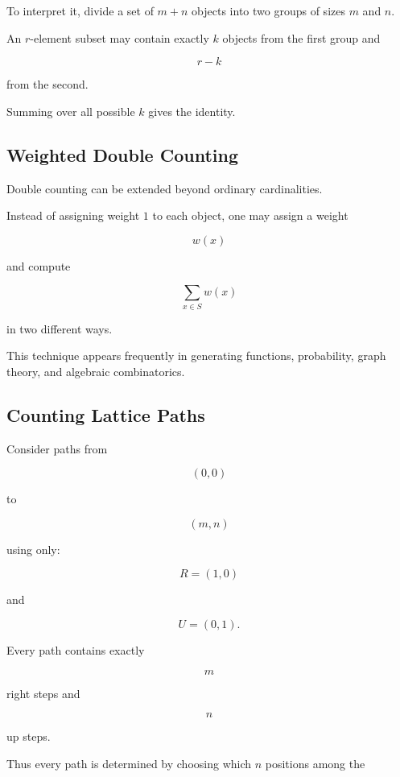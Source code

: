 To interpret it, divide a set of \(m+n\) objects into two groups of
sizes \(m\) and \(n\).

An \(r\)-element subset may contain exactly \(k\) objects from the first
group and

\[
r-k
\]

from the second.

Summing over all possible \(k\) gives the identity.

\subsection{Weighted Double Counting}
\label{subsec:weighted-double-counting}

Double counting can be extended beyond ordinary cardinalities.

Instead of assigning weight \(1\) to each object, one may assign a
weight

\[
w(x)
\]

and compute

\[
\sum_{x\in S}w(x)
\]

in two different ways.

This technique appears frequently in generating functions,
probability, graph theory, and algebraic combinatorics.

\subsection{Counting Lattice Paths}
\label{subsec:lattice-paths-basic}

Consider paths from

\[
(0,0)
\]

to

\[
(m,n)
\]

using only:

\[
R=(1,0)
\]

and

\[
U=(0,1).
\]

Every path contains exactly

\[
m
\]

right steps and

\[
n
\]

up steps.

Thus every path is determined by choosing which \(n\) positions among
the

